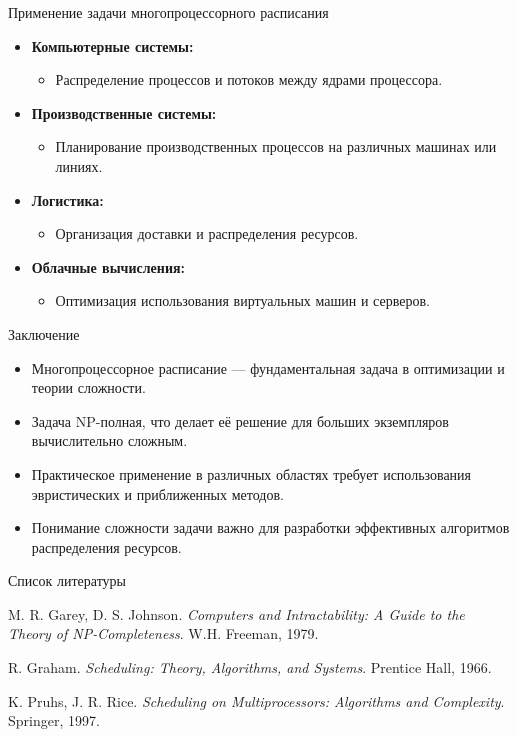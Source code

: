 \documentclass{beamer}
\begin{document}
\begin{frame}{Применение задачи многопроцессорного расписания}
    \begin{itemize}
        \item \textbf{Компьютерные системы:}
        \begin{itemize}
            \item Распределение процессов и потоков между ядрами процессора.
        \end{itemize}
        \item \textbf{Производственные системы:}
        \begin{itemize}
            \item Планирование производственных процессов на различных машинах или линиях.
        \end{itemize}
        \item \textbf{Логистика:}
        \begin{itemize}
            \item Организация доставки и распределения ресурсов.
        \end{itemize}
        \item \textbf{Облачные вычисления:}
        \begin{itemize}
            \item Оптимизация использования виртуальных машин и серверов.
        \end{itemize}
    \end{itemize}
\end{frame}

\begin{frame}{Заключение}
    \begin{itemize}
        \item Многопроцессорное расписание — фундаментальная задача в оптимизации и теории сложности.
        \item Задача NP-полная, что делает её решение для больших экземпляров вычислительно сложным.
        \item Практическое применение в различных областях требует использования эвристических и приближенных методов.
        \item Понимание сложности задачи важно для разработки эффективных алгоритмов распределения ресурсов.
    \end{itemize}
\end{frame}

\begin{frame}{Список литературы}
    \begin{thebibliography}{9}
        M. R. Garey, D. S. Johnson. \textit{Computers and Intractability: A Guide to the Theory of NP-Completeness}. W.H. Freeman, 1979.
        
        R. Graham. \textit{Scheduling: Theory, Algorithms, and Systems}. Prentice Hall, 1966.
        
        K. Pruhs, J. R. Rice. \textit{Scheduling on Multiprocessors: Algorithms and Complexity}. Springer, 1997.
    \end{thebibliography}
\end{frame}
\end{document}
